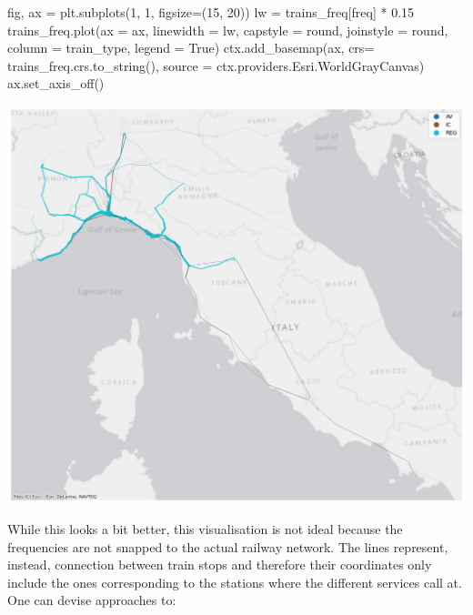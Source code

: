 \documentclass[
  letterpaper,
  DIV=11,
  numbers=noendperiod]{scrreprt}
\newenvironment{Shaded}{\begin{snugshade}}{\end{snugshade}}
\newcommand{\DecValTok}[1]{\textcolor[rgb]{0.68,0.00,0.00}{#1}}
\newcommand{\FloatTok}[1]{\textcolor[rgb]{0.68,0.00,0.00}{#1}}
\newcommand{\NormalTok}[1]{\textcolor[rgb]{0.00,0.23,0.31}{#1}}
\newcommand{\OperatorTok}[1]{\textcolor[rgb]{0.37,0.37,0.37}{#1}}
\newcommand{\StringTok}[1]{\textcolor[rgb]{0.13,0.47,0.30}{#1}}
\newcommand{\VariableTok}[1]{\textcolor[rgb]{0.07,0.07,0.07}{#1}}
\begin{document}
\begin{Shaded}
\begin{Highlighting}[]
\NormalTok{fig, ax }\OperatorTok{=}\NormalTok{ plt.subplots(}\DecValTok{1}\NormalTok{, }\DecValTok{1}\NormalTok{, figsize}\OperatorTok{=}\NormalTok{(}\DecValTok{15}\NormalTok{, }\DecValTok{20}\NormalTok{))}
\NormalTok{lw }\OperatorTok{=}\NormalTok{ trains\_freq[}\StringTok{\textquotesingle{}freq\textquotesingle{}}\NormalTok{] }\OperatorTok{*} \FloatTok{0.15}
\NormalTok{trains\_freq.plot(ax }\OperatorTok{=}\NormalTok{ ax, linewidth }\OperatorTok{=}\NormalTok{ lw, capstyle }\OperatorTok{=} \StringTok{\textquotesingle{}round\textquotesingle{}}\NormalTok{, joinstyle }\OperatorTok{=} \StringTok{\textquotesingle{}round\textquotesingle{}}\NormalTok{, column }\OperatorTok{=} \StringTok{\textquotesingle{}train\_type\textquotesingle{}}\NormalTok{, legend }\OperatorTok{=} \VariableTok{True}\NormalTok{)}
\NormalTok{ctx.add\_basemap(ax, crs}\OperatorTok{=}\NormalTok{ trains\_freq.crs.to\_string(), source }\OperatorTok{=}\NormalTok{ ctx.providers.Esri.WorldGrayCanvas)}
\NormalTok{ax.set\_axis\_off()}
\end{Highlighting}
\end{Shaded}

\includegraphics{labs/w02_maps_files/figure-pdf/cell-56-output-1.png}

While this looks a bit better, this visualisation is not ideal because
the frequencies are not snapped to the actual railway network. The lines
represent, instead, connection between train stops and therefore their
coordinates only include the ones corresponding to the stations where
the different services call at. One can devise approaches to:
\end{document}

